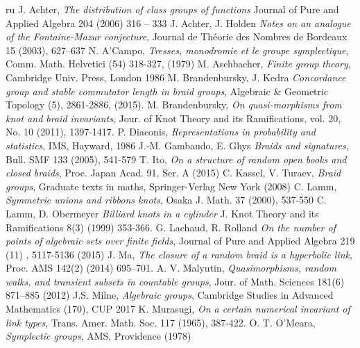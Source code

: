\documentclass[12pt]{article}
\begin{document}
	 \begin{thebibliography}{ru}
	 	 J. Achter, {\it The distribution of class groups of functions} Journal of Pure and Applied Algebra 204 (2006) 316 – 333
	 	 J. Achter, J. Holden {\it Notes on an analogue of the Fontaine-Mazur
	 	conjecture}, Journal de Th\'eorie des Nombres de Bordeaux 15 (2003), 627–637
	 	 N. A'Campo, {\it Tresses, monodromie et le groupe symplectique}, Comm. Math. Helvetici (54) 
	 	318-327, (1979)
	 	  M. Aschbacher, {\it Finite group theory}, Cambridge Univ. Press, London 1986
	 	  M. Brandenbursky, J. Kedra {\it Concordance group and stable commutator length in braid groups}, Algebraic \& Geometric Topology (5), 2861-2886, (2015).
	 	  M. Brandenbursky, {\it On quasi-morphisms from knot and braid invariants}, Jour. of Knot Theory and its Ramifications, vol. 20, No. 10 (2011), 1397-1417.
	 	  P. Diaconis, {\it Representations in probability and statistics}, IMS, Hayward, 1986
	 	  J.-M. Gambaudo, E. Ghys {\it Braids and signatures}, Bull. SMF 133 (2005), 541-579
	 	  T. Ito, {\it On a structure of random open books and closed braids}, Proc. Japan Acad. 91, Ser. A (2015) 
 	 C. Kassel, V. Turaev, {\it Braid groups}, Graduate texts in maths, Springer-Verlag New York (2008)
  C. Lamm, {\it Symmetric unions and ribbons knots}, Osaka  J. Math. 37  (2000),  537-550
 		 C.  Lamm, D. Obermeyer {\it Billiard knots in a cylinder} J. Knot Theory and its Ramifications 8(3) (1999) 353-366.
 		 G. Lachaud, R. Rolland {\it On the number of points of algebraic sets over finite fields}, Journal of Pure and Applied Algebra
 		219 (11) ,  5117-5136 (2015)
 		 J. Ma, {\it The closure of a random braid is a hyperbolic link}, Proc. AMS 142(2) (2014) 695–701.
 		 A. V. Malyutin, {\it Quasimorphisms, random walks, and transient subsets in countable groups}, 	
 		Jour. of Math. Sciences 181(6) 871--885  (2012)
 			 J.S. Milne, {\it Algebraic groups}, Cambridge Studies in Advanced Mathematics (170), CUP 2017
 			K. Murasugi, {\it On a certain numerical invariant of link types}, Trans. Amer. Math.
 			Soc. 117 (1965), 387-422. 
 			 O. T. O'Meara, {\it Symplectic groups}, AMS, Providence (1978)

\end{thebibliography}
\end{document}
